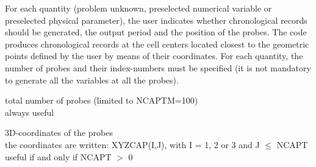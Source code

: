 For each quantity (problem unknown, preselected numerical variable or
preselected physical parameter), the user indicates whether chronological records
should be generated, the output period and the position of the
probes. The code produces chronological records at the cell centers located
closest to the geometric points defined by the user by means of their
coordinates. For each quantity, the number of probes and their
index-numbers must be specified (it is not mandatory to generate all
the variables at all the probes).


{total number of probes (limited to NCAPTM=100)\\
always useful }

{3D-coordinates of the probes\\
the coordinates are written: XYZCAP(I,J), with I = 1, 2 or 3 and J
$\leqslant$ NCAPT\\
useful if and only if NCAPT $>$ 0}


